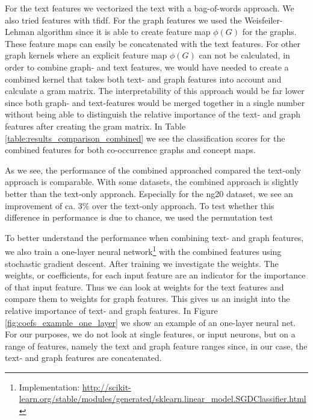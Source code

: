 For the text features we vectorized the text with a bag-of-words approach. We also tried features with tfidf.
For the graph features we used the Weisfeiler-Lehman algorithm since it is able to create feature map $\phi(G)$ for the graphs.
These feature maps can easily be concatenated with the text features.
For other graph kernels where an explicit feature map $\phi(G)$ can not be calculated, in order to combine graph- and text features, we would have needed to create a combined kernel that takes both text- and graph features into account and calculate a gram matrix.
The interpretability of this approach would be far lower since both graph- and text-features would be merged together in a single number without being able to distinguish the relative importance of the text- and graph features after creating the gram matrix.
In Table \ref{table:results_comparison_combined} we see the classification scores for the combined features for both co-occurrence graphs and concept maps.

As we see, the performance of the combined approached compared the text-only approach is comparable.
With some datasets, the combined approach is slightly better than the text-only approach. Especially for the ng20 dataset, we see an improvement of ca. 3\% over the text-only approach.
To test whether this difference in performance is due to chance, we used the permutation test

To better understand the performance when combining text- and graph features, we also train a one-layer neural network\footnote{Implementation: \url{http://scikit-learn.org/stable/modules/generated/sklearn.linear_model.SGDClassifier.html}} with the combined features using stochastic gradient descent. After training we investigate the weights.
The weights, or coefficients, for each input feature are an indicator for the importance of that input feature.
Thus we can look at weights for the text features and compare them to weights for graph features.
This gives us an insight into the relative importance of text- and graph features.
In Figure \ref{fig:coefs_example_one_layer} we show an example of an one-layer neural net.
For our purposes, we do not look at single features, or input neurons, but on a range of features, namely the text and graph feature ranges since, in our case, the text- and graph features are concatenated.

